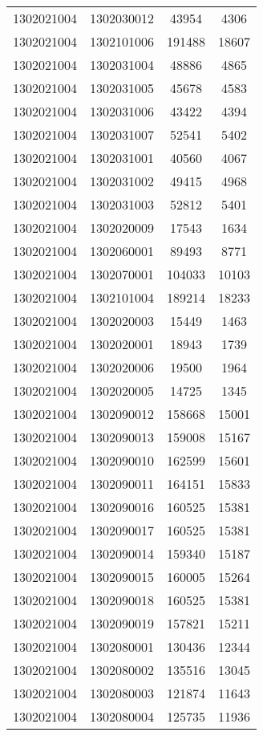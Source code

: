 \begin{longtable}[h]{llcc}
		1302021004 & 1302030012 & 43954 & 4306\\
		1302021004 & 1302101006 & 191488 & 18607\\
		1302021004 & 1302031004 & 48886 & 4865\\
		1302021004 & 1302031005 & 45678 & 4583\\
		1302021004 & 1302031006 & 43422 & 4394\\
		1302021004 & 1302031007 & 52541 & 5402\\
		1302021004 & 1302031001 & 40560 & 4067\\
		1302021004 & 1302031002 & 49415 & 4968\\
		1302021004 & 1302031003 & 52812 & 5401\\
		1302021004 & 1302020009 & 17543 & 1634\\
		1302021004 & 1302060001 & 89493 & 8771\\
		1302021004 & 1302070001 & 104033 & 10103\\
		1302021004 & 1302101004 & 189214 & 18233\\
		1302021004 & 1302020003 & 15449 & 1463\\
		1302021004 & 1302020001 & 18943 & 1739\\
		1302021004 & 1302020006 & 19500 & 1964\\
		1302021004 & 1302020005 & 14725 & 1345\\
		1302021004 & 1302090012 & 158668 & 15001\\
		1302021004 & 1302090013 & 159008 & 15167\\
		1302021004 & 1302090010 & 162599 & 15601\\
		1302021004 & 1302090011 & 164151 & 15833\\
		1302021004 & 1302090016 & 160525 & 15381\\
		1302021004 & 1302090017 & 160525 & 15381\\
		1302021004 & 1302090014 & 159340 & 15187\\
		1302021004 & 1302090015 & 160005 & 15264\\
		1302021004 & 1302090018 & 160525 & 15381\\
		1302021004 & 1302090019 & 157821 & 15211\\
		1302021004 & 1302080001 & 130436 & 12344\\
		1302021004 & 1302080002 & 135516 & 13045\\
		1302021004 & 1302080003 & 121874 & 11643\\
		1302021004 & 1302080004 & 125735 & 11936\\

\end{longtable}

